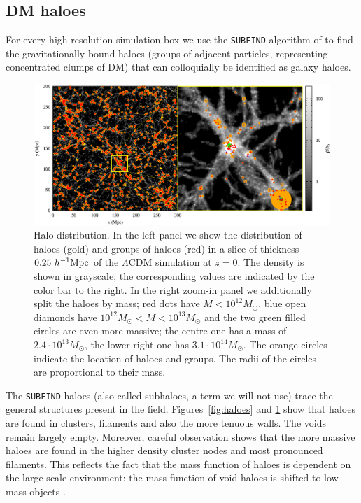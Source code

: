 \subsection{DM haloes}
\label{sec:dm_haloes}
For every high resolution simulation box we use the \texttt{SUBFIND} algorithm of \citet{springel01} to find the gravitationally bound 
haloes (groups of adjacent particles, representing concentrated clumps of DM) that can colloquially be identified as galaxy haloes.

\begin{figure}
\includegraphics[width=\textwidth]{ch_voidsde/img/haloslice}
\caption{Halo distribution.
In the left panel we show the distribution of haloes (gold) and groups of haloes (red) in a slice of thickness $0.25~h^{-1} {\rm Mpc}$
of the $\Lambda$CDM simulation at $z=0$. The density is shown in grayscale; the corresponding values are indicated by the color bar to the right.
In the right zoom-in panel we additionally split the haloes by mass; red dots have $M < 10^{12}M_\odot$, blue open diamonds have 
$10^{12}M_\odot < M < 10^{13}M_\odot$ and the two green filled circles are even more massive; the centre one has a mass of $2.4\cdot10^{13}M_\odot$, 
the lower right one has $3.1\cdot10^{14}M_\odot$. The orange circles indicate the location of haloes and groups. The radii of the circles 
are proportional to their mass.}
\label{fig:haloslice}
\end{figure}

The \texttt{SUBFIND} haloes (also called subhaloes, a term we will not use) trace the general structures present in the field. 
Figures~\ref{fig:haloes} and \ref{fig:haloslice} show that haloes are found in clusters, filaments and also 
the more tenuous walls. The voids remain largely empty. Moreover, careful observation shows that the more massive haloes are found in the 
higher density cluster nodes and most pronounced filaments. This reflects the fact that the mass function of haloes is 
dependent on the large scale environment: the mass function of void haloes is shifted to low mass objects \citep[see e.g.][]{aragon07}. 

